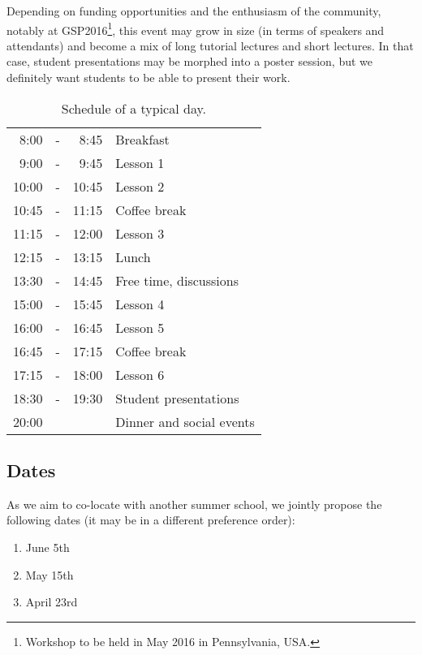 \documentclass[a4paper]{scrartcl}
\begin{document}
Depending on funding opportunities and the enthusiasm of the community, notably
at GSP2016\footnote{Workshop to be held in May 2016 in Pennsylvania, USA.}, this
event may grow in size (in terms of speakers and attendants) and become a mix of
long tutorial lectures and short lectures. In that case, student presentations
may be morphed into a poster session, but we definitely want students to be able
to present their work.

\begin{table}[ht]
	\centering
	\begin{tabular}{rcrl}
	 8:00 & - &  8:45 & Breakfast \\
	 9:00 & - &  9:45 & Lesson 1 \\
	10:00 & - & 10:45 & Lesson 2 \\
	10:45 & - & 11:15 & Coffee break \\
	11:15 & - & 12:00 & Lesson 3 \\
	12:15 & - & 13:15 & Lunch \\
	13:30 & - & 14:45 & Free time, discussions \\
	15:00 & - & 15:45 & Lesson 4 \\
	16:00 & - & 16:45 & Lesson 5 \\
	16:45 & - & 17:15 & Coffee break \\
	17:15 & - & 18:00 & Lesson 6 \\
	18:30 & - & 19:30 & Student presentations \\
	20:00 &   &       & Dinner and social events
	\end{tabular}
	\caption{Schedule of a typical day.}
	\label{schedule}
\end{table}

\subsection{Dates}

As we aim to co-locate with another summer school, we jointly propose the
following dates (it may be in a different preference order):
\begin{enumerate}
	\setlength{\itemsep}{0pt} \setlength{\parskip}{0pt}
	\item June 5th
	\item May 15th
	\item April 23rd
\end{enumerate}
\end{document}
